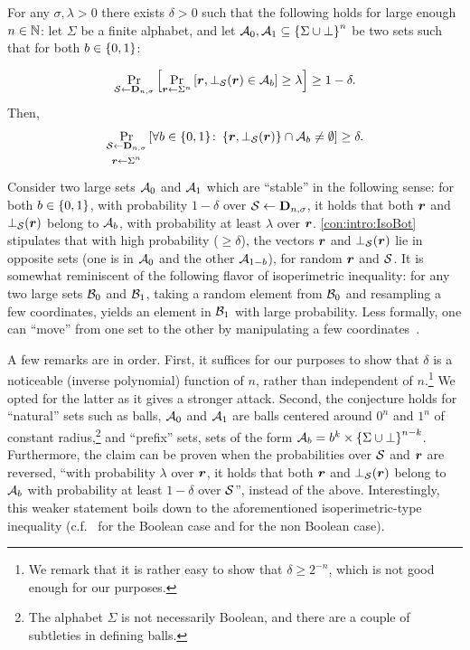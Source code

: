 \def\MainConj{
For any $\sigma,\lambda >0$ there exists $\delta>0$ such that the following holds for large enough $n\in \N$: let  $\Sigma$ be a finite alphabet, and let $\cA_0,\cA_1 \subseteq \sbn$  be  two  sets such that for both $b\in \zo$:

\begin{align*}%
\ppr{\cs\gets \bns}{\ppr{\vr \gets \Sigma^n}{\vr,\bot_{\cS}(\vr) \in \cA_b} \ge  \lambda } \ge 1-\delta.
\end{align*}
Then,
\begin{align*}%
\ppr{\substack{\cS \gets \bns \vspace{.05in}\\ \vr\gets \Sigma^n }}{\forall b\in \zo\colon  \set{\vr,\bot_{\cS}(\vr)}  \cap \cA_b \neq \emptyset} \ge  \delta.
\end{align*}
}


\begin{conjecture}\label{con:intro:IsoBot}
\MainConj
\end{conjecture}

\noindent
Consider two large sets $\mathcal{A}_0$ and $\mathcal{A}_1$ which are ``stable'' in the following sense:  for both $b\in \{0,1\}$, with probability $1-\delta$ over $\mathcal{S}\gets \mathbf{D}_{n,\sigma}$, it holds that both ${ \boldsymbol{r}}$ and $\bot_{\mathcal{S}}({ \boldsymbol{r}})$ belong to $\mathcal{A}_b$, with probability at least $\lambda$ over ${ \boldsymbol{r}}$.  \cref{con:intro:IsoBot} stipulates  that with high probability ($\ge \delta$), the vectors ${ \boldsymbol{r}}$ and $\bot_{\mathcal{S}}({ \boldsymbol{r}})$ lie in opposite sets (\ie one is in $\mathcal{A}_0$ and the other $\mathcal{A}_{1-b}$), for random ${ \boldsymbol{r}}$ and $\mathcal{S}$. It is somewhat reminiscent of the following flavor of isoperimetric inequality: for any two large sets $\mathcal{B}_0$ and $\mathcal{B}_1$, taking a random element from $\mathcal{B}_0$ and resampling a few coordinates, yields an element in $\mathcal{B}_1$ with large probability. Less formally, one can ``move'' from one set to the other by manipulating a few coordinates~\cite{Mossel2006,Mossel2013}.


A few remarks are in order. First, it suffices for our purposes to show that $\delta$ is a noticeable (\ie inverse polynomial) function of $n$, rather than independent of $n$.\footnote{We remark that it is rather easy to show that $\delta\ge 2^{-n}$, which is not good enough for our purposes.} We opted for the latter as it gives a stronger attack. Second, the conjecture holds for ``natural'' sets such as balls, \ie $\mathcal{A}_0$ and $\mathcal{A}_1$ are balls centered around $0^n$ and $1^n$ of constant radius,\footnote{The alphabet $\Sigma$ is not necessarily Boolean, and there are a couple of subtleties in defining balls.} and ``prefix'' sets, \ie sets of the form $\mathcal{A}_b=b^k \times \left\{\Sigma \cup \bot\right\}^{n-k}$. Furthermore, the claim can be proven
when the probabilities over $\mathcal{S}$ and ${ \boldsymbol{r}}$ are reversed, \ie ``with probability $\lambda$ over ${ \boldsymbol{r}}$, it holds that both ${ \boldsymbol{r}}$ and $\bot_{\mathcal{S}}({ \boldsymbol{r}})$ belong to $\mathcal{A}_b$ with probability at least $1-\delta$ over $\mathcal{S}$'', instead of the above. Interestingly, this weaker statement boils down to the aforementioned isoperimetric-type inequality (c.f.~\cite{Mossel2006} for the Boolean case and \cite{Mossel2013} for the non Boolean case).
	
